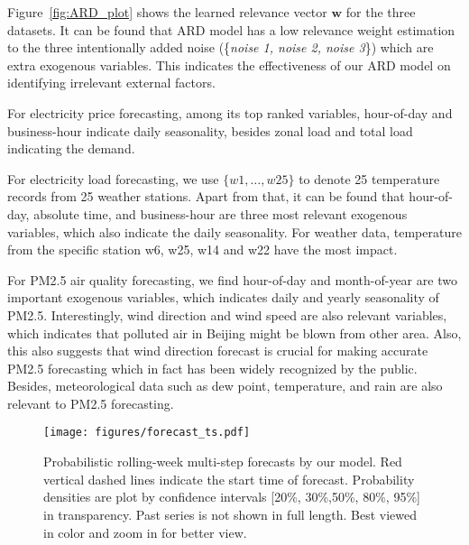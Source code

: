 \documentclass{article}
\begin{document}
Figure~\ref{fig:ARD_plot} shows the learned relevance vector $\mathbf{w}$ for the three datasets. It can be found that ARD model has a low relevance weight estimation to the three intentionally added noise  (\{\textit{noise 1, noise 2, noise 3}\}) which are extra exogenous variables. This indicates the effectiveness of our ARD model on identifying irrelevant external factors.

For electricity price forecasting, among its top ranked variables, hour-of-day and business-hour indicate daily seasonality, besides zonal load and total load indicating the demand.

For electricity load forecasting, we use $\{w1,\dots,w25\}$ to denote 25 temperature records from 25 weather stations. Apart from that, it can be found that hour-of-day, absolute time, and business-hour are three most relevant exogenous variables, which also indicate the daily seasonality. For weather data, temperature from the specific station w6, w25, w14 and w22 have the most impact.

For PM2.5 air quality forecasting, we find hour-of-day and month-of-year are two important exogenous variables, which indicates daily and yearly seasonality of PM2.5. Interestingly, wind direction and wind speed are also relevant variables, which indicates that polluted air in Beijing might be blown from other area. Also, this also suggests that wind direction forecast is crucial for making accurate PM2.5 forecasting which in fact has been widely recognized by the public. Besides, meteorological data such as dew point, temperature, and rain are also relevant to PM2.5 forecasting.
\begin{figure*}[!tb]
    \centering
    \texttt{[image: figures/forecast\_ts.pdf]}
    \caption{Probabilistic rolling-week multi-step forecasts by our model. Red vertical dashed lines indicate the start time of forecast. Probability densities are plot by confidence intervals [20\%, 30\%,50\%, 80\%, 95\%] in transparency. Past series is not shown in full length. Best viewed in color and zoom in for better view.}
    \label{fig:prob_forecast}
\end{figure*}
\end{document}

